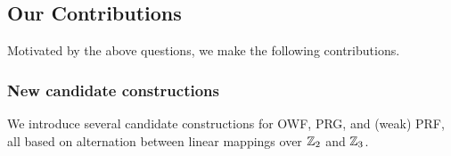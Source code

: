 
\subsection{Our Contributions}


Motivated by the above questions, we make the following contributions.

\iffalse
\paragraph{\bf \textnormal{OT} and \textnormal{VOLE} friendliness}.
    MPC protocols in the preprocessing model can take advantage of input-independent correlated randomness to better handle nonlinear gates~\cite{Beaver,BDOZ,SPDZ,PowerOfCorrelatedRandomness,TinyTables,BGI19}. However, some kinds of correlated randomness are better than other. Recent work~\cite{?} for instance, has shown how pseudorandom correlation generators (PCGs) can be used to generate millions of ``OT'' and ``VOLE'' correlations with very low and computation costs. Furthermore, it is not necessary to store all of these correlations; they can stored in a compressed form, and expanded only when needed~\cite{?}. Roughly speaking, an OT correlation is useful for evaluating a ``simple'' nonlinear gates (such as Boolean AND) and a VOLE correlation is useful for scalar-vector products. We would like to maximize the potential benefit from these recent techniques.


\mahimna{still writing}
\fi


\subsubsection{New candidate constructions}
We introduce several candidate constructions for OWF, PRG, and (weak) PRF, all based on alternation between linear mappings over $\mathbb{Z}_2$ and $\mathbb{Z}_3$.

